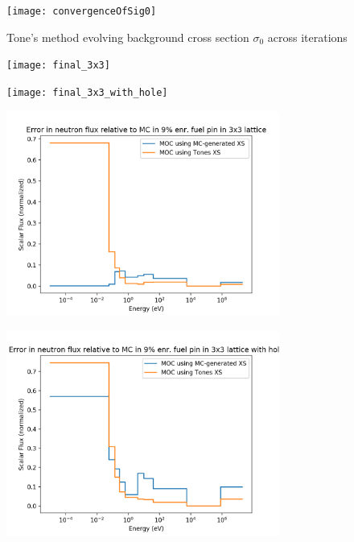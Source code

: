 \documentclass{beamer}
\begin{document}
\begin{frame}
\begin{figure}
\texttt{[image: convergenceOfSig0]}
  \caption{Tone's method evolving background cross section $\sigma_0$ across iterations}
\end{figure}
\end{frame}




\begin{frame}
\begin{figure}
\texttt{[image: final\_3x3]}
\end{figure}
\end{frame}


\begin{frame}
\begin{figure}
\texttt{[image: final\_3x3\_with\_hole]}
\end{figure}
\end{frame}

\begin{frame}
\begin{figure}
\includegraphics[width=0.8\textwidth]{error_3x3}
\end{figure}
\end{frame}


\begin{frame}
\begin{figure}
\includegraphics[width=0.8\textwidth]{error_3x3_with_hole}
\end{figure}
\end{frame}
\end{document}
